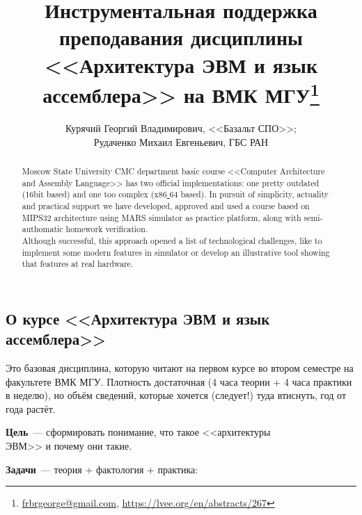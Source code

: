 \documentclass[10pt, a5paper]{article}
\begin{document}
\title{Инструментальная поддержка преподавания дисциплины <<Архитектура ЭВМ и язык ассемблера>> на ВМК МГУ\footnote{\url{frbrgeorge@gmail.com}, \url{https://lvee.org/en/abstracts/267}}}
\author{Курячий Георгий Владимирович, <<Базальт СПО>>; \\ Рудаченко Михаил Евгеньевич, ГБС РАН}
\maketitle
\begin{abstract}
Moscow State University CMC department basic course <<Com\-puter Architecture and Assembly Language>> has two official implementations: one pretty outdated (16bit based) and one too complex (x86\underline{ }64 based). In pursuit of simplicity, actuality and practical support we have developed, approved and used a course based on MIPS32 architecture using MARS simulator as practice platform, along with semi-authomatic homework verification.\\ Although successful, this approach opened a list of technological challenges, like to implement some modern features in simulator or develop an illustrative tool showing that features at real hard\-ware.
\end{abstract}

\subsection*{О курсе <<Архитектура ЭВМ и язык ассемблера>>}

Это базовая дисциплина, которую читают на первом курсе во втором семестре на факультете ВМК МГУ. Плотность достаточная (4 часа теории + 4 часа практики в неделю), но объём сведений, которые хочется (следует!) туда втиснуть, год от года растёт.

\textbf{Цель}~--- сформировать понимание, что такое <<архитектуры \\ЭВМ>> и почему они такие.

\textbf{Задачи}~--- теория + фактология + практика:
\end{document}
